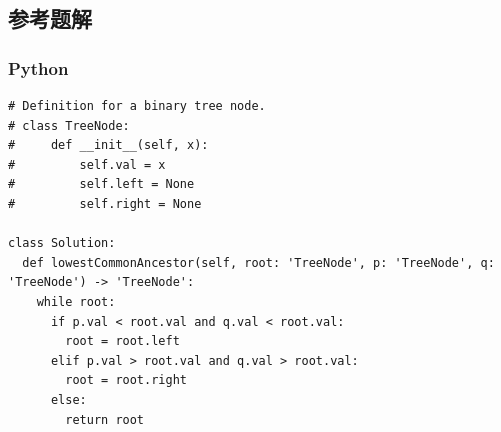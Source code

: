 \subsection{参考题解}

\subsubsection{Python}

\begin{verbatim}
# Definition for a binary tree node.
# class TreeNode:
#     def __init__(self, x):
#         self.val = x
#         self.left = None
#         self.right = None

class Solution:
  def lowestCommonAncestor(self, root: 'TreeNode', p: 'TreeNode', q: 'TreeNode') -> 'TreeNode':
    while root:
      if p.val < root.val and q.val < root.val:
        root = root.left
      elif p.val > root.val and q.val > root.val:
        root = root.right
      else:
        return root
\end{verbatim}
